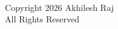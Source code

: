 

\chapter*{}
\hspace{1em}\vspace{18em} \\ %
\begin{center}
    Copyright {\textcopyright} 2026 Akhilesh Raj \\
    All Rights Reserved     
\end{center}


